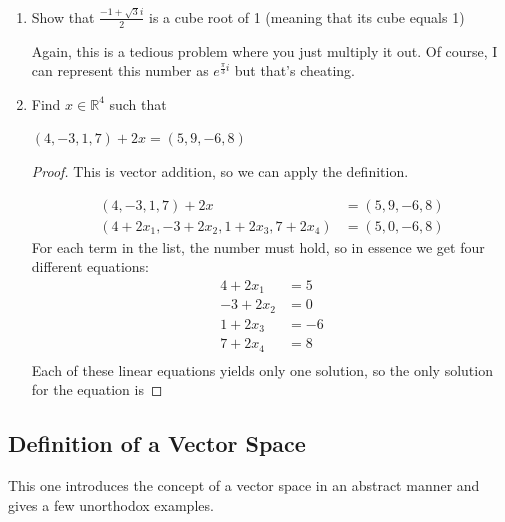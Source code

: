 \begin{enumerate}
    \item[7] Show that $\frac{-1 + \sqrt{3}i}{2}$ is a cube root of 1 (meaning that its cube equals 1)
    
    Again, this is a tedious problem where you just multiply it out. Of course, I can represent this number as $e^{\frac{\pi}{3}i}$ but that's cheating.

    \item[9] Find $x \in \mathbb{R}^4$ such that

    $(4, -3, 1, 7) + 2x = (5, 9, -6, 8)$

    \begin{proof}
        This is vector addition, so we can apply the definition. 

        \begin{align*}
            (4, -3, 1, 7) + 2x &= (5, 9, -6, 8) \\
            (4 + 2x_1, -3 + 2x_2, 1 + 2x_3, 7 + 2x_4) &= (5, 0, -6, 8)
        \end{align*}
        For each term in the list, the number must hold, so in essence we get four different equations:
        \begin{align*}
            4 + 2x_1 &= 5 \\
            -3 + 2x_2 &= 0 \\
            1 + 2x_3 &= -6 \\
            7 + 2x_4 &= 8 \\
        \end{align*}
        Each of these linear equations yields only one solution, so the only solution for the equation is 
    \end{proof}
\end{enumerate}

\subsection{Definition of a Vector Space}

This one introduces the concept of a vector space in an abstract manner and gives a few unorthodox examples.

